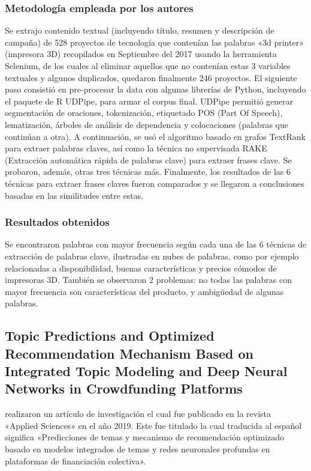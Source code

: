 \subsubsection{Metodología empleada por los autores}
Se extrajo contenido textual (incluyendo título, resumen y descripción de campaña) de 528 proyectos de tecnología que contenían las palabras «3d printer» (impresora 3D) recopilados en Septiembre del 2017 usando la herramienta Selenium, de los cuales al eliminar aquellos que no contenían estas 3 variables textuales y algunos duplicados, quedaron finalmente 246 proyectos. El siguiente paso consistió en pre-procesar la data con algunas librerías de Python, incluyendo el paquete de R UDPipe, para armar el corpus final. UDPipe permitió generar segmentación de oraciones, tokenización, etiquetado POS (Part Of Speech), lematización, árboles de análisis de dependencia y colocaciones (palabras que continúan a otra). A continuación, se usó el algoritmo basado en grafos TextRank para extraer palabras claves, así como la técnica no supervisada RAKE (Extracción automática rápida de palabras clave) para extraer frases clave. Se probaron, además, otras tres técnicas más.
Finalmente, los resultados de las 6 técnicas para extraer frases claves fueron comparados y se llegaron a conclusiones basadas en las similitudes entre estas.

\subsubsection{Resultados obtenidos}
Se encontraron palabras con mayor frecuencia según cada una de las 6 técnicas de extracción de palabras clave, ilustradas en nubes de palabras, como por ejemplo relacionadas a disponibilidad, buenas características y precios cómodos de impresoras 3D. También se observaron 2 problemas: no todas las palabras con mayor frecuencia son características del producto, y ambigüedad de algunas palabras.

\subsection{Topic Predictions and Optimized Recommendation	Mechanism Based on Integrated Topic Modeling and Deep Neural Networks in Crowdfunding Platforms \citep*{pr_shafqat2019topicpredictions}}
\citeauthor{pr_shafqat2019topicpredictions} realizaron un artículo de investigación el cual fue publicado en la revista «Applied Sciences» en el año 2019. Este fue titulado  la cual traducida al español significa «Predicciones de temas y mecanismo de recomendación optimizado basado en modelos integrados de temas y redes neuronales profundas en plataformas de financiación colectiva».

